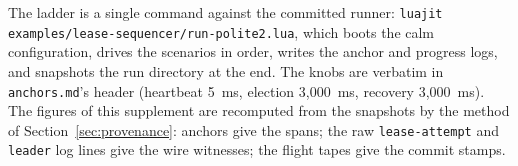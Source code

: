 \documentclass[10pt,journal,letterpaper]{IEEEtran}
\newcommand{\code}[1]{\texttt{\small #1}}
\begin{document}
The ladder is a single command against the committed runner:
\code{luajit examples/lease-sequencer/run-polite2.lua}, which boots
the calm configuration, drives the scenarios in order, writes the
anchor and progress logs, and snapshots the run directory at the end.
The knobs are verbatim in \code{anchors.md}'s header (heartbeat 5~ms,
election 3{,}000~ms, recovery 3{,}000~ms). The figures of this
supplement are recomputed from the snapshots by the method of
Section~\ref{sec:provenance}: anchors give the spans; the raw
\code{lease-attempt} and \code{leader} log lines give the wire
witnesses; the flight tapes give the commit stamps.
\end{document}
